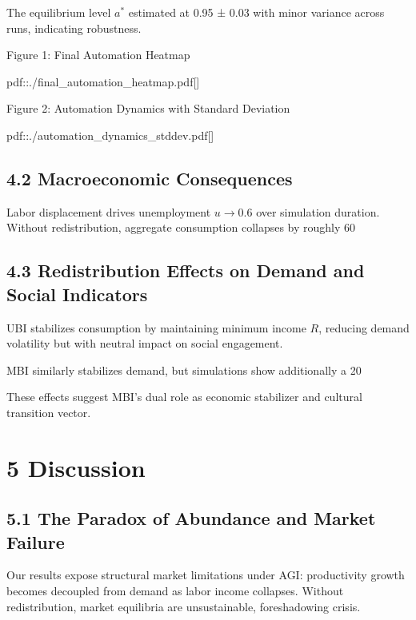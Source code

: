 \documentclass[11pt]{amsart}
\begin{document}
The equilibrium level $a^*$ estimated at 0.95 ± 0.03 with minor variance across runs, indicating robustness.


Figure 1: Final Automation Heatmap


pdf::./final_automation_heatmap.pdf[]


Figure 2: Automation Dynamics with Standard Deviation


pdf::./automation_dynamics_stddev.pdf[]


\hypertarget{x-4.2-macroeconomic-consequences}{\subsection{4.2 Macroeconomic Consequences}}
Labor displacement drives unemployment $u \to 0.6$ over simulation duration. Without redistribution, aggregate consumption collapses by roughly 60%


\hypertarget{x-4.3-redistribution-effects-on-demand-and-social-indicators}{\subsection{4.3 Redistribution Effects on Demand and Social Indicators}}
UBI stabilizes consumption by maintaining minimum income $R$, reducing demand volatility but with neutral impact on social engagement.


MBI similarly stabilizes demand, but simulations show additionally a 20%


These effects suggest MBI’s dual role as economic stabilizer and cultural transition vector.


\hypertarget{x-5-discussion}{\section{5 Discussion}}
\hypertarget{x-5.1-the-paradox-of-abundance-and-market-failure}{\subsection{5.1 The Paradox of Abundance and Market Failure}}
Our results expose structural market limitations under AGI: productivity growth becomes decoupled from demand as labor income collapses. Without redistribution, market equilibria are unsustainable, foreshadowing crisis.
\end{document}
